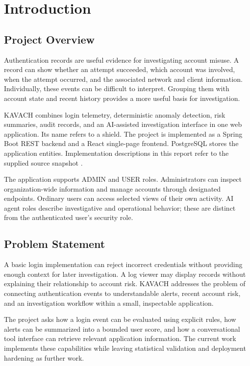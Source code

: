 \chapter{Introduction}
\section{Project Overview}
Authentication records are useful evidence for investigating account misuse. A record can show whether an attempt succeeded, which account was involved, when the attempt occurred, and the associated network and client information. Individually, these events can be difficult to interpret. Grouping them with account state and recent history provides a more useful basis for investigation.

KAVACH combines login telemetry, deterministic anomaly detection, risk summaries, audit records, and an AI-assisted investigation interface in one web application. Its name refers to a shield. The project is implemented as a Spring Boot REST backend and a React single-page frontend. PostgreSQL stores the application entities. Implementation descriptions in this report refer to the supplied source snapshot \cite{repo}.

The application supports ADMIN and USER roles. Administrators can inspect organization-wide information and manage accounts through designated endpoints. Ordinary users can access selected views of their own activity. AI agent roles describe investigative and operational behavior; these are distinct from the authenticated user's security role.

\section{Problem Statement}
A basic login implementation can reject incorrect credentials without providing enough context for later investigation. A log viewer may display records without explaining their relationship to account risk. KAVACH addresses the problem of connecting authentication events to understandable alerts, recent account risk, and an investigation workflow within a small, inspectable application.

The project asks how a login event can be evaluated using explicit rules, how alerts can be summarized into a bounded user score, and how a conversational tool interface can retrieve relevant application information. The current work implements these capabilities while leaving statistical validation and deployment hardening as further work.

